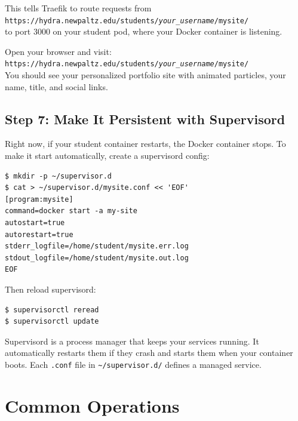 \documentclass[11pt, letterpaper]{article}
\begin{document}
This tells Traefik to route requests from\\
\texttt{https://hydra.newpaltz.edu/students/\textit{your\_username}/mysite/}\\
to port 3000 on your student pod, where your Docker container is listening.

\begin{tipbox}[Test it!]
Open your browser and visit:\\
\texttt{https://hydra.newpaltz.edu/students/\textit{your\_username}/mysite/}\\[0.5em]
You should see your personalized portfolio site with animated particles, your
name, title, and social links.
\end{tipbox}

\subsection{Step 7: Make It Persistent with Supervisord}

Right now, if your student container restarts, the Docker container stops.
To make it start automatically, create a supervisord config:

\begin{lstlisting}[style=terminal]
$ mkdir -p ~/supervisor.d
$ cat > ~/supervisor.d/mysite.conf << 'EOF'
[program:mysite]
command=docker start -a my-site
autostart=true
autorestart=true
stderr_logfile=/home/student/mysite.err.log
stdout_logfile=/home/student/mysite.out.log
EOF
\end{lstlisting}

Then reload supervisord:

\begin{lstlisting}[style=terminal]
$ supervisorctl reread
$ supervisorctl update
\end{lstlisting}

\begin{infobox}
Supervisord is a process manager that keeps your services running. It
automatically restarts them if they crash and starts them when your container
boots. Each \texttt{.conf} file in \texttt{\textasciitilde/supervisor.d/}
defines a managed service.
\end{infobox}

\section{Common Operations}
\end{document}
